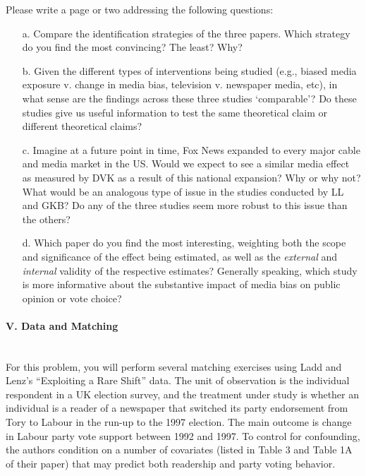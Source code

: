 \documentclass{article}
\begin{document}
\vspace{1em}

Please write a page or two addressing the following questions:


   \begin{itemize}
   \item[a.]  Compare the identification strategies of the
     three papers.  Which strategy do you find the most convincing?
     The least?  Why?

   \item[b.] Given the different types of interventions being studied
     (e.g., biased media exposure v. change in media bias, television v. newspaper media,
     etc), in what sense are the findings across these three studies
     `comparable'?  Do these studies give us useful information to
     test the same theoretical claim or different theoretical claims?  

   \item[c.] Imagine at a future point in time, Fox News expanded to
    every major cable and media market in the US. Would we 
     expect to see a similar media effect as measured by DVK as a
     result of this national expansion?  Why or why
    not?  What would be an analogous type of issue in the studies
    conducted by LL and GKB?  Do any of the three studies seem more
    robust to this issue than the others?

   \item[d.]  Which paper do you find the most 
     interesting, weighting both the scope and significance of the
     effect being estimated, as well as the {\em external} and {\em internal} validity
     of the respective estimates?  Generally speaking, which study is
     more informative about the substantive impact of media bias on 
public opinion or vote choice?  


\end{itemize}




\paragraph{\Large V. Data and Matching \\ \\}

For this problem, you will perform several matching exercises using
Ladd and Lenz's ``Exploiting a Rare Shift'' data.  The unit of
observation is the individual respondent in a UK election survey, and
the treatment under study is whether an individual is a reader of a
newspaper that switched its party endorsement from Tory to Labour in
the run-up to the 1997 election.  The main outcome is change in Labour
party vote support between 1992 and 1997.  To control for confounding,
the authors condition on a number of covariates (listed in Table 3
and Table 1A of their paper) that may predict both readership and party voting
behavior.
\\
\end{document}
